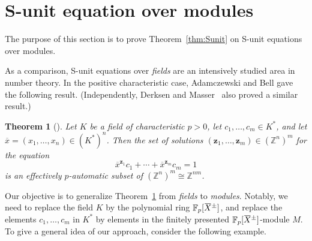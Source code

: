 \documentclass[a4paper,UKenglish,cleveref, autoref, thm-restate]{lipics-v2021}
\newcommand{\Z}{\mathbb{Z}}
\newcommand{\F}{\mathbb{F}}
\newcommand{\bz}{\boldsymbol{z}}
\newcommand{\oX}{\mkern 1.5mu\overline{\mkern-1.5mu X \mkern-1.5mu}\mkern 1.5mu}
\newcommand{\ox}{\overline{x}}
\newtheorem{thrm}{Theorem}[section]
\theoremstyle{definition}
\theoremstyle{definition}
\theoremstyle{definition}
\begin{document}
\section{S-unit equation over modules}\label{sec:Sunit}

The purpose of this section is to prove Theorem~\ref{thm:Sunit} on S-unit equations over modules.

\thmSunit*

As a comparison, S-unit equations over \emph{fields} are an intensively studied area in number theory. In the positive characteristic case, Adamczewski and Bell gave the following result. (Independently, Derksen and Masser~\cite{derksen2012linear} also proved a similar result.)
\begin{thrm}[{\cite[Theorem~3.1]{adamczewski2012vanishing}}]\label{thm:Sunitexample}
    Let $K$ be a field of characteristic $p > 0$, let $c_1, \ldots , c_m \in K^*$, and let $\ox = (x_1, \ldots, x_n) \in \left(K^*\right)^n$. Then the set of solutions $(\bz_1, \ldots, \bz_m) \in \left(\Z^n\right)^m$ for the equation
    \begin{equation*}
        \ox^{\bz_1} c_1 + \cdots + \ox^{\bz_m} c_m = 1
    \end{equation*}
    is an effectively $p$-automatic subset of $\left(\Z^n\right)^m \cong \Z^{nm}$.
\end{thrm}
Our objective is to generalize Theorem~\ref{thm:Sunitexample} from \emph{fields} to \emph{modules}. Notably, we need to replace the field $K$ by the polynomial ring $\F_p[\oX^{\pm}]$, and replace the elements $c_1, \ldots , c_m$ in $K^*$ by elements in the finitely presented $\F_p[\oX^{\pm}]$-module $M$. 
To give a general idea of our approach, consider the following example.
\end{document}
